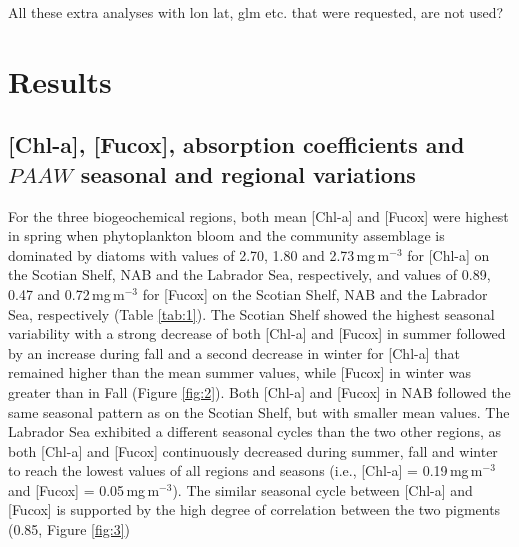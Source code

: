 \documentclass[utf8]{frontiersSCNS} %
\begin{document}
All these extra analyses with lon lat, glm etc. that were requested, are not used?

\section{Results}

\subsection{[Chl-a], [Fucox], absorption coefficients and $PAAW$ seasonal and regional variations}

For the three biogeochemical regions, both mean [Chl-a] and [Fucox] were highest in spring when phytoplankton bloom and the community assemblage is dominated by diatoms with values of 2.70, 1.80 and 2.73\,mg\,m$^{-3}$ for [Chl-a] on the Scotian Shelf, NAB and the Labrador Sea, respectively,  and values of 0.89, 0.47 and 0.72\,mg\,m$^{-3}$ for [Fucox] on the Scotian Shelf, NAB and the Labrador Sea, respectively (Table \ref{tab:1}). The Scotian  Shelf showed the highest seasonal variability with a strong decrease of both [Chl-a] and [Fucox] in summer followed by an increase during fall and a second decrease in winter for [Chl-a] that remained higher than the mean summer values, while [Fucox] in winter was greater than in Fall (Figure \ref{fig:2}). Both [Chl-a] and [Fucox] in NAB followed the same seasonal pattern as on the Scotian Shelf, but with smaller mean values. The Labrador Sea exhibited a  different seasonal cycles than the two other regions, as both [Chl-a] and [Fucox] continuously decreased during summer, fall and winter to reach the lowest values of all regions and seasons (i.e., [Chl-a] = 0.19\,mg\,m$^{-3}$ and [Fucox] = 0.05\,mg\,m$^{-3}$). The similar seasonal cycle between [Chl-a] and [Fucox] is supported by the high degree of correlation between the two pigments (0.85, Figure \ref{fig:3})
\end{document}

